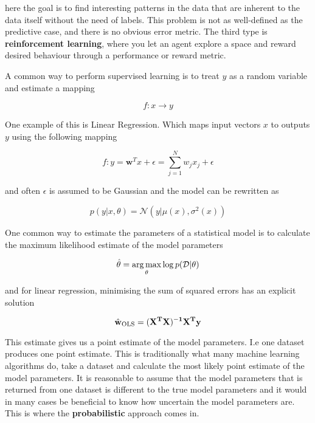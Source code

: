 here the goal is to find interesting patterns in the data that are inherent to the data itself without the need of labels. This problem is not as well-defined as the predictive case, and there is no obvious error metric. The third type is \textbf{reinforcement learning}, where you let an agent explore a space and reward desired behaviour through a performance or reward metric. 

A common way to perform supervised learning is to treat  $y$ as a random variable and estimate a mapping 

\begin{equation*}
    f: x \rightarrow y
\end{equation*}

One example of this is Linear Regression. Which maps input vectors $x$ to outputs $y$ using the following mapping \cite[p.~19]{Murphy:2012:Book}

\begin{equation*}
    f: y = \mathbf{w}^Tx + \epsilon = \sum_{j=1}^N w_j x_j + \epsilon
\end{equation*}

and often $\epsilon$ is assumed to be Gaussian and the model can be rewritten as 

\begin{equation*}
    p(y|x, \theta) = \mathcal{N}(y|\mu(x), \sigma^2(x))
\end{equation*}

One common way to estimate the parameters of a statistical model is to calculate the maximum likelihood estimate of the model parameters \cite[p.~217]{Murphy:2012:Book}

\begin{equation*}
    \hat{\mathbf{\theta}} = \operatorname*{arg\,max}_{\theta} \log p(\mathcal{D}|\theta)
\end{equation*}

and for linear regression, minimising the sum of squared errors has an explicit solution \cite[p.~220]{Murphy:2012:Book}

\begin{equation*}
    \hat{\bf{w}}_{\text{OLS}} = (\bf{X}^T\bf{X})^{-1}\bf{X}^T\bf{y}
\end{equation*}

This estimate gives us a point estimate of the model parameters. I.e one dataset produces one point estimate. This is traditionally what many machine learning algorithms do, take a dataset and calculate the most likely point estimate of the model parameters. It is reasonable to assume that the model parameters that is returned from one dataset is different to the true model parameters and it would in many cases be beneficial to know how uncertain the model parameters are. This is where the \textbf{probabilistic} approach comes in.

